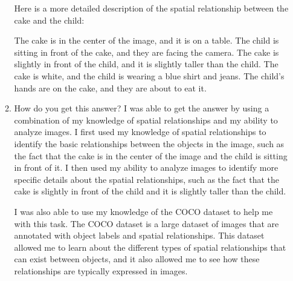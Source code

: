 \begin{enumerate}
\begin{enumerate}
        Here is a more detailed description of the spatial relationship between the cake and the child:
        
        The cake is in the center of the image, and it is on a table.
        The child is sitting in front of the cake, and they are facing the camera.
        The cake is slightly in front of the child, and it is slightly taller than the child.
        The cake is white, and the child is wearing a blue shirt and jeans.
        The child's hands are on the cake, and they are about to eat it.
        \item How do you get this answer?
        \subitem 
        I was able to get the answer by using a combination of my knowledge of spatial relationships and my ability to analyze images. I first used my knowledge of spatial relationships to identify the basic relationships between the objects in the image, such as the fact that the cake is in the center of the image and the child is sitting in front of it. I then used my ability to analyze images to identify more specific details about the spatial relationships, such as the fact that the cake is slightly in front of the child and it is slightly taller than the child.
        
        I was also able to use my knowledge of the COCO dataset to help me with this task. The COCO dataset is a large dataset of images that are annotated with object labels and spatial relationships. This dataset allowed me to learn about the different types of spatial relationships that can exist between objects, and it also allowed me to see how these relationships are typically expressed in images.
        

\end{enumerate}
\end{enumerate}

